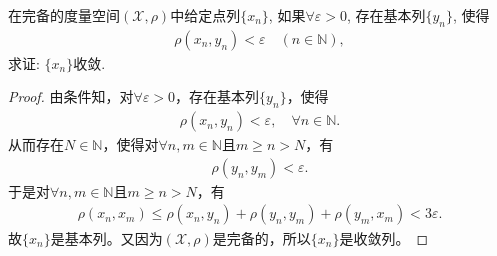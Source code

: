 \documentclass[../../main.tex]{subfiles}%
\begin{document}
\begin{example}
在完备的度量空间$(\mathscr{X},\rho)$中给定点列$\{x_n\}$, 如果$\forall \varepsilon>0$, 存在基本列$\{y_n\}$, 使得
\begin{align*}
\rho(x_n,y_n)<\varepsilon \quad (n\in\mathbb{N}),
\end{align*}
求证: $\{x_n\}$收敛.
\end{example}
\begin{proof}
由条件知，对$\forall \varepsilon>0$，存在基本列$\{y_n\}$，使得
\begin{align*}
\rho(x_n,y_n)<\varepsilon,\quad \forall n\in\mathbb{N}.
\end{align*}
从而存在$N\in\mathbb{N}$，使得对$\forall n,m\in\mathbb{N}$且$m\geqslant n>N$，有
\begin{align*}
\rho(y_n,y_m)<\varepsilon.
\end{align*}
于是对$\forall n,m\in\mathbb{N}$且$m\geqslant n>N$，有
\begin{align*}
\rho(x_n,x_m)\leqslant\rho(x_n,y_n)+\rho(y_n,y_m)+\rho(y_m,x_m)<3\varepsilon.
\end{align*}
故$\{x_n\}$是基本列。又因为$(\mathscr{X},\rho)$是完备的，所以$\{x_n\}$是收敛列。
\end{proof}
\end{document}
